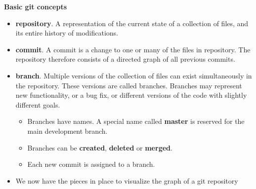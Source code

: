 \documentclass[12pt]{article}
\begin{document}
{\bf Basic git concepts}

\begin{itemize}
\item {\bf repository}. A representation of the current state of a collection of files, and its entire history of modifications. 

\item {\bf commit}. A commit is a change to one or many of the files in repository. The repository therefore consists of a directed graph of all previous commits.

\item {\bf branch}. Multiple versions of the collection of files can exist simultaneously in the repository. 
These versions are called branches. 
Branches may represent new functionality, or a bug fix, or different versions of the code with slightly different goals. 
\begin{itemize}
\item Branches have names. A special name called {\bf master} is reserved for the main development branch.

\item Branches can be {\bf created}, {\bf deleted} or {\bf merged}. 

\item Each new commit is assigned to a branch.
\end{itemize}
\item We now have the pieces in place to visualize the graph of a git repository
\end{itemize}
\end{document}
